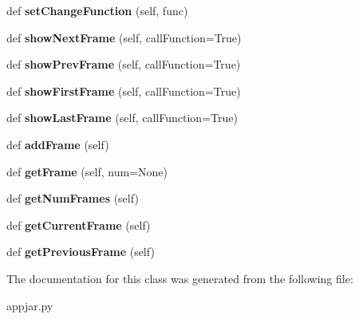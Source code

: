 \begin{DoxyCompactItemize}
def {\bfseries set\+Change\+Function} (self, func)
\item 
\mbox{\label{class_python_01_g_u_i_1_1appjar_1_1_frame_stack_ab6bd42a55c7754093bbe6829e287242b}} 
def {\bfseries show\+Next\+Frame} (self, call\+Function=True)
\item 
\mbox{\label{class_python_01_g_u_i_1_1appjar_1_1_frame_stack_a37384462892ca8aec028856e868e6794}} 
def {\bfseries show\+Prev\+Frame} (self, call\+Function=True)
\item 
\mbox{\label{class_python_01_g_u_i_1_1appjar_1_1_frame_stack_a334ceb65950cc4e5432241f8cefefacd}} 
def {\bfseries show\+First\+Frame} (self, call\+Function=True)
\item 
\mbox{\label{class_python_01_g_u_i_1_1appjar_1_1_frame_stack_aef920f7859d184547b5a79a4c20cae83}} 
def {\bfseries show\+Last\+Frame} (self, call\+Function=True)
\item 
\mbox{\label{class_python_01_g_u_i_1_1appjar_1_1_frame_stack_a6c01f3a61f0be886fcc7b16152dfcbb6}} 
def {\bfseries add\+Frame} (self)
\item 
\mbox{\label{class_python_01_g_u_i_1_1appjar_1_1_frame_stack_a1ea0fb48fac522fdc7042e027e02cbd2}} 
def {\bfseries get\+Frame} (self, num=None)
\item 
\mbox{\label{class_python_01_g_u_i_1_1appjar_1_1_frame_stack_ade2338d697aefed8467af4622da001eb}} 
def {\bfseries get\+Num\+Frames} (self)
\item 
\mbox{\label{class_python_01_g_u_i_1_1appjar_1_1_frame_stack_a062ba848afcb7213ffb1a9b36d89ddb1}} 
def {\bfseries get\+Current\+Frame} (self)
\item 
\mbox{\label{class_python_01_g_u_i_1_1appjar_1_1_frame_stack_ac73e1bad6162fdfc592f852959388b28}} 
def {\bfseries get\+Previous\+Frame} (self)
\end{DoxyCompactItemize}


The documentation for this class was generated from the following file\+:\begin{DoxyCompactItemize}
\item 
appjar.\+py\end{DoxyCompactItemize}
